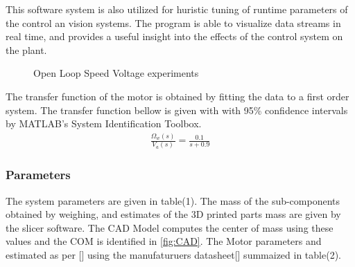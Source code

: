         This software system is also utilized for huristic tuning of runtime parameters of the control an vision systems. 
        The program is able to visualize data streams in real time, and provides a useful insight into
        the effects of the control system on the plant.
        \begin{figure}[H]
            \centering
            \caption{Open Loop Speed Voltage experiments}
        \end{figure}    
        The transfer function of the motor is obtained by fitting the data to a first order system.
        The transfer function bellow is given with with 95\% confidence intervals by MATLAB's System Identification Toolbox.
        \begin{equation}
            \begin{aligned}
                \frac{\Omega_w \left(s\right)}{V_a \left(s\right)}=\frac{0.1}{s+0.9}
            \end{aligned}
        \end{equation}
        \pagebreak{}
        \subsubsection{Parameters }
        The system parameters are given in table(1). 
        The mass of the sub-components obtained by weighing,
        and estimates of the 3D printed parts mass are given by the slicer software. 
        The CAD Model computes the center of mass using these values and the COM is identified in \ref{fig:CAD}.
        The Motor parameters and estimated as per [] using the manufaturuers datasheet[] summaized in table(2).
    
